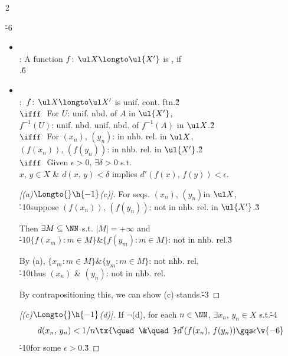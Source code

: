 \documentclass[dvipdfmx,a4paper,titlepage,9pt]{jsarticle}
\begin{document}
\begin{multicols*}{2}
\vfill\null\columnbreak

\v{-6}
\begin{itemize}[label=-]
\item{}\\
: A function $f\!:\,\ul X\longto\ul{X'}$ is , if\\
\;\;.\v6

\item{}\\
: \qquad\,$f\!:\,\ul X\longto\ul X'$ is unif. cont. ftn.\v2\\
\;\;$\ifff\;$ For $U$: unif. nbd. of $A$ in $\ul{X'}$,\\
\;\;\qquad\;$f^{-1}(U)$: unif. nbd. unif. nbd. of $f^{-1}(A)$ in $\ul X$.\v2\\
\;\;$\ifff\;$ For $(x_n)$, $(y_n)$: in nhb. rel. in $\ul X$,\\
\;\;\qquad\;$(f(x_n))$, $(f(y_n))$: in nhb. rel. in $\ul{X'}$.\v2\\
\;\;$\ifff\;$ Given $\epsilon>0$, $\exists\delta>0$ s.t.\\
\;\;\qquad\;$x$, $y\in X$ \& $d(x,\,y)<\delta$ implies $d'(f(x),\,f(y))<\epsilon$.

\begin{pfbox}
\rnc{\qedsymbol}{\Sq}
\begin{proof}[{[(a)${}\Longto{}\h{-1}$(c)]}]
For seqs. $(x_n)$, $(y_n)$in $\ul X$, \\
\h{-10}suppose $(f(x_n))$, $(f(y_n))$: not in nhb. rel. in $\ul{X'}$.\v3

Then $\exists M\subseteq\NN$ s.t. $|M|=+\infty$ and\\
\h{-10}$\{f(x_m):m\in M\}$\&$\{f(y_m):m\in M\}$: not in nhb. rel.\v3

By (a), $\{x_m:m\in M\}$\&$\{y_m:m\in M\}$: not nhb. rel,\\
\h{-10}thus $(x_n)$ \& $(y_n)$: not in nhb. rel.

By contrapositioning this, we can show (c) stands.\v{-3}
\end{proof}

\dotfill

\begin{proof}[{[(c)${}\Longto{}\h{-1}$(d)]}]
If $\neg$(d), for each $n\in\NN$, $\exists x_n$, $y_n\in X$ s.t.\v{-4}
$$d(x_n,\,y_n)<1/n\tx{\quad\&\quad}d'(f(x_n),\,f(y_n))\gqs\epsilon\v{-6}$$
\h{-10}for some $\epsilon>0$.\v3


\end{proof}
\end{pfbox}
\end{itemize}
\end{multicols*}
\end{document}
